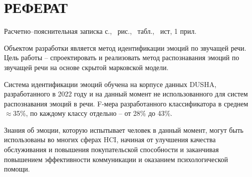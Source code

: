 \part*{РЕФЕРАТ}

Расчетно--пояснительная записка \pageref{LastPage} с., \totalfigures\ рис., \totaltables\ табл., \thetotalbibentries\ ист, 1 прил.

Объектом разработки является метод идентификации эмоций по звучащей речи. Цель работы -- спроектировать и реализовать метод распознавания эмоций по звучащей речи на основе скрытой марковской модели. 

Система идентификации эмоций обучена на корпусе данных DUSHA, разработанного в 2022 году и на данный момент не использованного для систем распознавания эмоций в речи. F-мера разработанного классификатора в среднем  $\approx$35\%, по каждому классу отдельно -- от 28\% до 43\%. 

Знания об эмоции, которую испытывает человек в данный момент, могут быть использованы во многих сферах HCI, начиная от улучшения качества обслуживания и повышения покупательской способности и заканчивая повышением эффективности коммуникации и оказанием психологической помощи. 